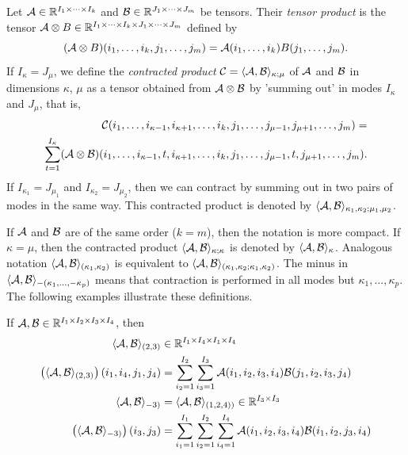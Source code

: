 Let $\mathcal{A} \in \mathbb{R}^{I_1 \times \cdots \times I_k} $ and $\mathcal{B}  \in \mathbb{R}^{J_1 \times \cdots \times J_m}$ be tensors.
Their \textit{tensor product} is the tensor $ \mathcal{A} \otimes B  \in {\mathbb{R}}^{I_1 \times \cdots \times I_k \times J_1 \times \cdots \times J_m } $
defined by
\begin{equation}
    (\mathcal{A} \otimes B)(i_1, \dots, i_k, j_1, \dots, j_m) = \mathcal{A}(i_1, \dots, i_k) B(j_1, \dots, j_m).
\end{equation}
If $I_{\kappa} = J_{\mu}$, we define the \textit{contracted product} $\mathcal{C} = \langle \mathcal{A}, \mathcal{B} \rangle_{\kappa; \mu} $ of $\mathcal{A}$ and $\mathcal{B}$ in dimensions $\kappa$, $\mu$ as a tensor
obtained from $\mathcal{A} \otimes \mathcal{B}$ by 'summing out' in modes $I_{\kappa}$ and $J_{\mu}$, that is,
\begin{eqnarray}
    \mathcal{C}(i_1, \dots, i_{\kappa-1}, i_{\kappa + 1} , \dots, i_{k}, j_1, \dots, j_{\mu - 1}, j_{\mu+1}, \dots, j_{m}) = \notag\\
    \sum_{t = 1}^{I_{\kappa}} (\mathcal{A} \otimes \mathcal{B})(i_1, \dots, i_{\kappa-1}, t, i_{\kappa+1}, \dots,  i_k, j_1, \dots, j_{\mu-1}, t, j_{\mu+1}, \dots, j_m).
\end{eqnarray}
If $I_{\kappa_1} = J_{\mu_1}$ and $I_{\kappa_2} = J_{\mu_2}$, then we can contract
by summing out in two pairs of modes in the same way. This contracted product is 
denoted by $\langle \mathcal{A}, \mathcal{B} \rangle_{\kappa_1, \kappa_2; \mu_1, \mu_2}$.



If $\mathcal{A}$ and $\mathcal{B}$ are of the same order ($k = m$), then the notation is more compact.
If $\kappa = \mu$, then the contracted product
$\langle \mathcal{A}, \mathcal{B} \rangle_{\kappa; \kappa}$
is denoted by $\langle \mathcal{A}, \mathcal{B} \rangle_{\kappa}$. Analogous notation $\langle \mathcal{A}, \mathcal{B} \rangle_{(\kappa_1, \kappa_2)}$ is equivalent to $\langle \mathcal{A}, \mathcal{B} \rangle_{(\kappa_1, \kappa_2;\kappa_1, \kappa_2)}$.
The minus in $\langle \mathcal{A}, \mathcal{B} \rangle _{ -(\kappa_1, \dots, -\kappa_p)}$ means 
that contraction is performed in all modes but $\kappa_1, \dots, \kappa_p$. The following examples 
illustrate these definitions.


If $\mathcal{A}, \mathcal{B} \in \mathbb{R}^{I_1 \times I_2 \times I_3 \times I_4}$, then
\begin{eqnarray*}
\begin{split}
\langle \mathcal{A}, \mathcal{B} \rangle_{(2,3)} & \in \mathbb{R}^{I_1 \times I_4 \times I_1 \times I_4} \\
\left( \langle \mathcal{A}, \mathcal{B} \rangle_{(2,3)}\right)(i_1, i_4, j_1, j_4) &= \sum_{i_2 = 1}^{I_2} \sum_{i_3 = 1}^{I_3} \mathcal{A}(i_1, i_2, i_3, i_4) \mathcal{B}(j_1, i_2, i_3, j_4) \\
\langle \mathcal{A}, \mathcal{B} \rangle_{-3)} &= \langle \mathcal{A}, \mathcal{B} \rangle_{(1,2,4))} \in \mathbb{R}^{I_3 \times I_3} \\
\left( \langle \mathcal{A}, \mathcal{B} \rangle_{-3)}\right)(i_3, j_3) &= \sum_{i_1 =1 }^{I_1} \sum_{i_2 = 1}^{I_2} \sum_{i_4 = 1}^{I_4} \mathcal{A}(i_1, i_2, i_3, i_4) \mathcal{B}(i_1, i_2, j_3, i_4) 
\end{split}
\end{eqnarray*}


